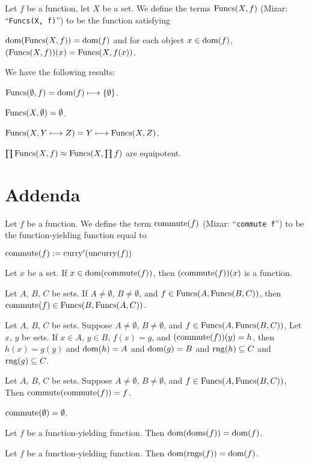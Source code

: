\documentclass{article}
\begin{document}
\begin{definition}
Let $f$ be a function, let $X$ be a set.
We define the terms $\operatorname{Funcs}(X,f)$ (Mizar: ``\verb#Funcs(X, f)#'') to be
the function satisfying
\begin{defn}
\item $\operatorname{dom}(\operatorname{Funcs}(X,f))=\operatorname{dom}(f)$ and for each object $x\in\operatorname{dom}(f)$,
  $(\operatorname{Funcs}(X,f))(x)=\operatorname{Funcs}(X,f(x))$.
\end{defn}
\end{definition}

We have the following results:
\begin{thm}
\item\label{funct6:50} $\operatorname{Funcs}(\emptyset,f)=\operatorname{dom}(f)\longmapsto\{\emptyset\}$.
\item\label{funct6:51} $\operatorname{Funcs}(X,\emptyset)=\emptyset$.
\item\label{funct6:52} $\operatorname{Funcs}(X,Y\longmapsto Z)=Y\longmapsto\operatorname{Funcs}(X,Z)$.
\item\label{funct6:53} $\prod\operatorname{Funcs}(X,f)\approx\operatorname{Funcs}(X,\prod f)$
  are equipotent.
\end{thm}

\section{Addenda}

\begin{definition}
Let $f$ be a function. We define the term $\operatorname{commute}(f)$
(Mizar: ``\verb#commute f#'') to be the function-yielding function equal
to
\begin{defn}
\item $\operatorname{commute}(f) := \operatorname{curry}'(\operatorname{uncurry}(f))$
\end{defn}
\end{definition}

\begin{thm}
\item\label{funct6:54} Let $x$ be a set.
  If $x\in\operatorname{dom}(\operatorname{commute}(f))$, then $(\operatorname{commute}(f))(x)$ is a function.
\item\label{funct6:55} Let $A$, $B$, $C$ be sets.
  If $A\neq\emptyset$, $B\neq\emptyset$, and $f\in\operatorname{Funcs}(A,\operatorname{Funcs}(B,C))$,
  then $\operatorname{commute}(f)\in\operatorname{Funcs}(B,\operatorname{Funcs}(A,C))$.
\item\label{funct6:56} Let $A$, $B$, $C$ be sets.
  Suppose $A\neq\emptyset$, $B\neq\emptyset$, and $f\in\operatorname{Funcs}(A,\operatorname{Funcs}(B,C))$,
  Let $x$, $y$ be sets.
  If $x\in A$, $y\in B$, $f(x)=g$, and $(\operatorname{commute}(f))(y)=h$, then
  $h(x)=g(y)$ and $\operatorname{dom}(h)=A$ and $\operatorname{dom}(g)=B$ and $\operatorname{rng}(h)\subseteq C$
  and $\operatorname{rng}(g)\subseteq C$.
\item\label{funct6:57} Let $A$, $B$, $C$ be sets.
  Suppose $A\neq\emptyset$, $B\neq\emptyset$, and $f\in\operatorname{Funcs}(A,\operatorname{Funcs}(B,C))$,
  Then $\operatorname{commute}(\operatorname{commute}(f))=f$.
\item\label{funct6:58} $\operatorname{commute}(\emptyset)=\emptyset$.
\item\label{funct6:59} Let $f$ be a function-yielding function. Then $\operatorname{dom}(\operatorname{doms}(f))=\operatorname{dom}(f)$.
\item\label{funct6:60} Let $f$ be a function-yielding function. Then $\operatorname{dom}(\operatorname{rngs}(f))=\operatorname{dom}(f)$.
\end{thm}
\end{document}
